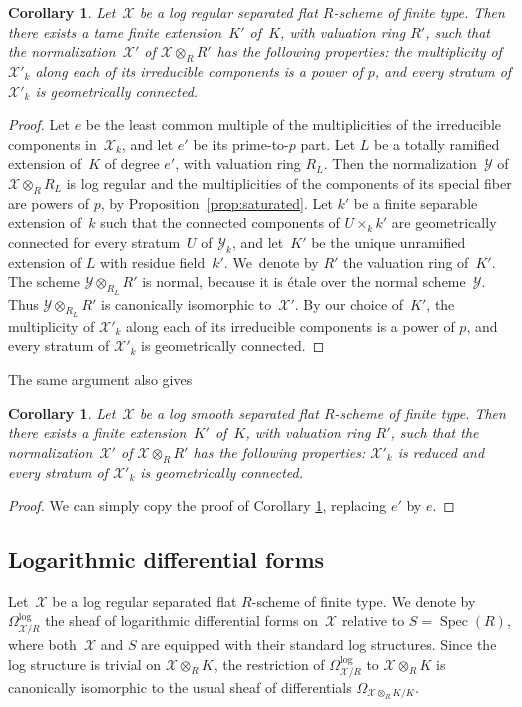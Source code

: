 \documentclass[JEP,XML,SOM,Unicode,NoFloatCountersInSection]{cedram}
\newtheorem{cor}[equation]{Corollary}
\theoremstyle{definition}
\numberwithin{equation}{subsection}
\newcommand{\cX}{\ensuremath{\mathscr{X}}}
\newcommand{\cY}{\ensuremath{\mathscr{Y}}}
\DeclareMathOperator{\Spec}{Spec}
\begin{document}
\begin{cor}\label{coro:ppower}
Let~$\cX$ be a log regular separated flat $R$\nobreakdash-scheme of finite type.
Then there exists a tame finite extension~$K'$ of~$K$, with valuation ring $R'$, such that
the normalization~$\cX'$ of $\cX\otimes_R R'$ has the following properties: the multiplicity of $\cX'_k$ along each of its
irreducible components is a power of $p$, and every stratum of $\cX'_k$ is geometrically connected.
\end{cor}
\begin{proof}
Let $e$ be the least common multiple of the multiplicities of the irreducible components in~$\cX_k$, and let $e'$ be its prime-to-$p$ part. Let $L$ be a totally ramified extension of~$K$ of degree $e'$, with valuation ring $R_L$. Then the normalization~$\cY$ of $\cX\otimes_R R_L$ is log regular and the multiplicities of the components of its special fiber are powers of $p$, by Proposition~\ref{prop:saturated}. Let $k'$ be a finite separable extension of~$k$ such that the connected components of $U\times_k k'$ are geometrically connected for every stratum~$U$ of $\cY_k$, and let~$K'$ be the unique unramified extension of $L$ with residue field~$k'$. We~denote by $R'$ the valuation ring of~$K'$. The scheme $\cY\otimes_{R_L} R'$ is normal, because it is étale over the normal scheme~$\cY$. Thus $\cY\otimes_{R_L} R'$ is canonically isomorphic to~$\cX'$. By our choice of~$K'$, the multiplicity of $\cX'_k$ along each of its irreducible components is a power of $p$, and every stratum of $\cX'_k$ is geometrically connected.
\end{proof}
The same argument also gives
\begin{cor}\label{coro:reduced}
Let~$\cX$ be a log smooth separated flat $R$\nobreakdash-scheme of finite type.
Then there exists a finite extension~$K'$ of~$K$, with valuation ring $R'$, such that
the normalization~$\cX'$ of $\cX\otimes_R R'$ has the following properties: $\cX'_k$ is reduced and every stratum of $\cX'_k$ is geometrically connected.
\end{cor}
\begin{proof}
We can simply copy the proof of Corollary \ref{coro:ppower}, replacing $e'$ by $e$.
\end{proof}

\subsection{Logarithmic differential forms}\label{ss:logdiff}
Let~$\cX$ be a log regular separated flat $R$\nobreakdash-scheme of finite type.
We denote by $\Omega^{\log}_{\cX/R}$ the sheaf of logarithmic differential forms on~$\cX$ relative to $S=\Spec(R)$, where both~$\cX$ and $S$ are equipped with their standard log structures. Since the log structure is trivial on $\cX\otimes_R K$, the restriction of $\Omega^{\log}_{\cX/R}$ to $\cX\otimes_R K$ is canonically isomorphic to the usual sheaf of differentials $\Omega_{\cX\otimes_R K/K}$.
\end{document}
